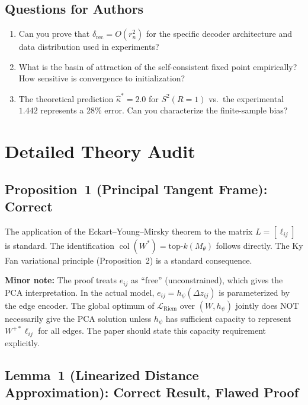 \documentclass{article}
\DeclareMathOperator{\col}{col}
\begin{document}
\subsection{Questions for Authors}

\begin{enumerate}[label=(Q\arabic*)]
\item Can you prove that $\delta_{\mathrm{rec}} = O(r_n^2)$ for the specific
  decoder architecture and data distribution used in experiments?
\item What is the basin of attraction of the self-consistent fixed point
  empirically? How sensitive is convergence to initialization?
\item The theoretical prediction $\hat{\kappa}^* = 2.0$ for $S^2(R{=}1)$
  vs.\ the experimental $1.442$ represents a 28\% error. Can you
  characterize the finite-sample bias?
\end{enumerate}

\section{Detailed Theory Audit}
\label{sec:audit}

\subsection{Proposition~1 (Principal Tangent Frame): Correct}

The application of the Eckart--Young--Mirsky theorem to the matrix
$L = [\ell_{ij}]$ is standard. The identification $\col(W^*) = \text{top-}k(M_\theta)$
follows directly. The Ky Fan variational principle (Proposition~2) is a
standard consequence.

\textbf{Minor note:} The proof treats $e_{ij}$ as ``free'' (unconstrained),
which gives the PCA interpretation. In the actual model, $e_{ij} = h_\psi(\Delta z_{ij})$
is parameterized by the edge encoder. The global optimum of $\mathcal{L}_{\text{Riem}}$
over $(W, h_\psi)$ jointly does NOT necessarily give the PCA solution unless
$h_\psi$ has sufficient capacity to represent $W^{+*}\ell_{ij}$ for all edges.
The paper should state this capacity requirement explicitly.

\subsection{Lemma~1 (Linearized Distance Approximation): Correct Result, Flawed Proof}
\label{sec:lemma1_audit}
\end{document}
